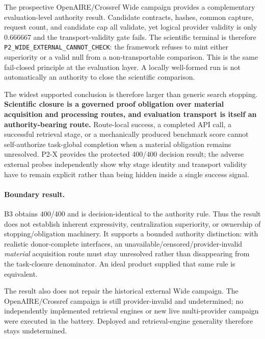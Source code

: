 The prospective OpenAIRE/Crossref Wide campaign provides a complementary evaluation-level authority result. Candidate contracts, hashes, common capture, request count, and candidate cap all validate, yet logical provider validity is only 0.666667 and the transport-validity gate fails. The scientific terminal is therefore \texttt{P2\_WIDE\_EXTERNAL\_CANNOT\_CHECK}: the framework refuses to mint either superiority or a valid null from a non-transportable comparison. This is the same fail-closed principle at the evaluation layer. A locally well-formed run is not automatically an authority to close the scientific comparison.

The widest supported conclusion is therefore larger than generic search stopping. \textbf{Scientific closure is a governed proof obligation over material acquisition and processing routes, and evaluation transport is itself an authority-bearing route.} Route-local success, a completed API call, a successful retrieval stage, or a mechanically produced benchmark score cannot self-authorize task-global completion when a material obligation remains unresolved. P2-X provides the protected 400/400 decision result; the adverse external probes independently show why stage identity and transport validity have to remain explicit rather than being hidden inside a single success signal.
\paragraph{Boundary result.}
B3 obtains 400/400 and is decision-identical to the authority rule. Thus the result does not establish inherent expressivity, centralization superiority, or ownership of stopping/obligation machinery. It supports a bounded authority distinction: with realistic donor-complete interfaces, an unavailable/censored/provider-invalid \emph{material} acquisition route must stay unresolved rather than disappearing from the task-closure denominator. An ideal product supplied that same rule is equivalent.

The result also does not repair the historical external Wide campaign. The OpenAIRE/Crossref campaign is still provider-invalid and undetermined; no independently implemented retrieval engines or new live multi-provider campaign were executed in the battery. Deployed and retrieval-engine generality therefore stays undetermined.
